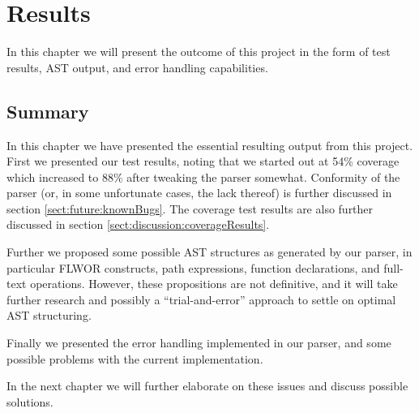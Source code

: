 \chapter{Results}
In this chapter we will present the outcome of this project in the form of test
results, AST output, and error handling capabilities.





\section{Summary}
In this chapter we have presented the essential resulting output from this
project. First we presented our test results, noting that we started out at   
54\% coverage which increased to 88\% after tweaking the parser somewhat.
Conformity of the parser (or, in some unfortunate cases, the lack thereof) is
further  discussed in section \ref{sect:future:knownBugs}. The coverage test
results are also further discussed in section
\ref{sect:discussion:coverageResults}.

Further we proposed some possible AST structures as generated by our parser, in
particular FLWOR constructs, path expressions, function declarations, and
full-text operations. However, these propositions are not definitive, and it
will take further research and possibly a ``trial-and-error'' approach to settle
on optimal AST structuring.

Finally we presented the error handling implemented in our parser, and some
possible problems with the current implementation. 

In the next chapter we will further elaborate on these issues and discuss
possible solutions.